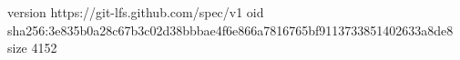 version https://git-lfs.github.com/spec/v1
oid sha256:3e835b0a28c67b3c02d38bbbae4f6e866a7816765bf9113733851402633a8de8
size 4152
